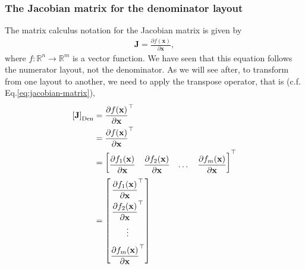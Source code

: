 \documentclass{article}
\begin{document}
\subsubsection{The Jacobian matrix for the denominator layout}
The matrix calculus notation for the Jacobian matrix is given by
\begin{align}
    \mathbf{J} = \frac{\partial f(\mathbf{x})}{\partial \mathbf{x}},
\end{align}
where \(f: \mathbb{R}^{n} \rightarrow \mathbb{R}^{m}\) is a vector function. We have seen that this equation follows the numerator layout, not the denominator. As we will see after, to transform from one layout to another, we need to apply the transpose operator, that is (c.f. Eq.\eqref{eq:jacobian-matrix}),
\begin{align}
    \left[ \mathbf{J} \right]_{\textnormal{Den}} & = \frac{\partial f(\mathbf{x})}{\partial \mathbf{x}}^{\top} \\
    & = \frac{\partial f(\mathbf{x})}{\partial \mathbf{x}}^\top\\
    & = \begin{bmatrix}
        \dfrac{\partial f_1(\mathbf{x})}{\partial \mathbf{x}} & \dfrac{\partial f_2(\mathbf{x})}{\partial \mathbf{x}} & \dots & \dfrac{\partial f_m(\mathbf{x})}{\partial \mathbf{x}}
    \end{bmatrix}^\top \\
    & = \renewcommand{\arraystretch}{2.2}\begin{bmatrix}
        \dfrac{\partial f_1(\mathbf{x})}{\partial \mathbf{x}}^\top \\ \dfrac{\partial f_2(\mathbf{x})}{\partial \mathbf{x}}^\top \\ \vdots \\ \dfrac{\partial f_m(\mathbf{x})}{\partial \mathbf{x}}^\top
    \end{bmatrix}
\end{align}
\end{document}
